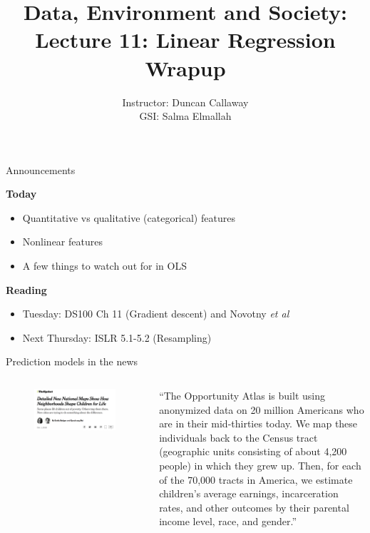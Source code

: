 \documentclass[aspectratio=169]{beamer}
\title[Lecture 11: Regression wrapup] %
{Data, Environment and Society: \\{Lecture 11: Linear Regression Wrapup}}
\author[ER131: Data, Environment and Society] 
{Instructor: Duncan Callaway\\
GSI: Salma Elmallah}
\institute[UC Berkeley] %
 {\small{ \bf October 3, 2019}}
\date[October 3, 2019]
\begin{document}
\begin{frame}
  \titlepage
\end{frame}

\begin{frame}{Announcements}

\textbf{Today}
\begin{itemize}
\item Quantitative vs qualitative (categorical) features
\item Nonlinear features
\item A few things to watch out for in OLS
\end{itemize}

\textbf{Reading}
\begin{itemize}
\item Tuesday: DS100 Ch 11 (Gradient descent) and Novotny \textit{et al}
\item Next Thursday: ISLR 5.1-5.2 (Resampling)
\end{itemize}
\end{frame}


\begin{frame}{Prediction models in the news}

\begin{columns}
\begin{figure}
\includegraphics[width=\textwidth]{NYT_poverty_maps}
\caption*{}
\end{figure}
``The Opportunity Atlas is built using anonymized data on 20 million Americans who are in their mid-thirties today. We map these individuals back to the Census tract (geographic units consisting of about 4,200 people) in which they grew up. Then, for each of the 70,000 tracts in America, we estimate children's average earnings, incarceration rates, and other outcomes by their parental income level, race, and gender.''
\end{columns}
\end{frame}
\end{document}
